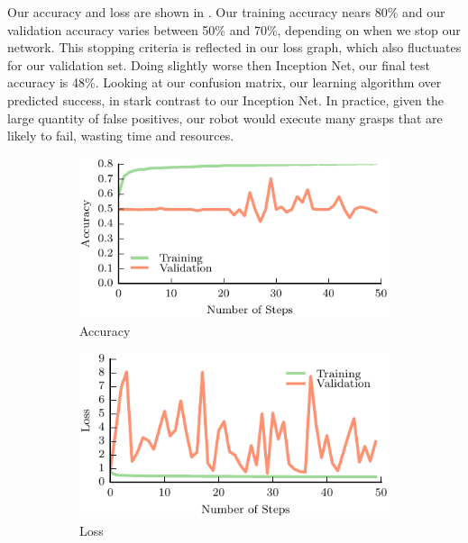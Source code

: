 Our accuracy and loss are shown in . 
Our training accuracy nears 80\% and our validation accuracy varies between 50\% and 70\%, depending on when we stop our network. 
This stopping criteria is reflected in our loss graph, which also fluctuates for our validation set. 
Doing slightly worse then Inception Net, our final test accuracy is 48\%. 
Looking at our confusion matrix, our learning algorithm over predicted success, in stark contrast to our Inception Net. 
In practice, given the large quantity of false positives, our robot would execute many grasps that are likely to fail, wasting time and resources. 

\begin{figure}[t!]
    \centering
    \begin{subfigure}[t]{0.32\textwidth}
        \includegraphics[width=0.9\columnwidth]{figs/res_net_accuracy.pdf}
        \caption{Accuracy} \label{fig:accuracy_res}
        \end{subfigure}
    \begin{subfigure}[t]{0.32\textwidth}
        \includegraphics[width=0.9\columnwidth]{figs/res_net_loss.pdf}
        \caption{Loss} \label{fig:loss_res}
    \end{subfigure}
		\begin{subfigure}[t]{0.32\textwidth}

\end{subfigure}
\end{figure}
